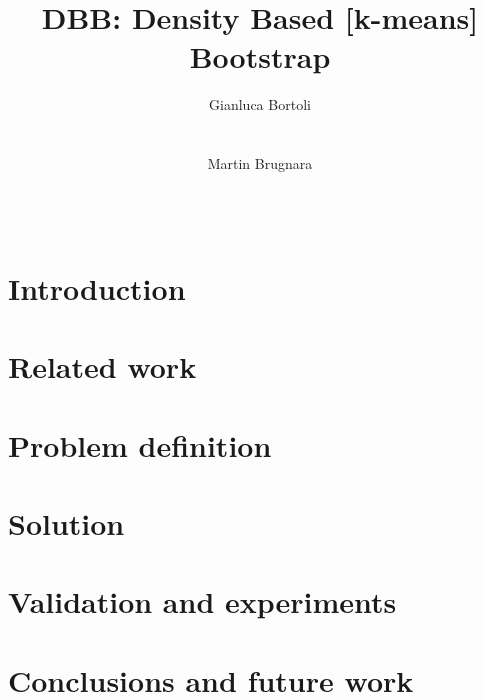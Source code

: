 \documentclass{sig-alternate-15}
\begin{document}
\title{DBB: Density Based [k-means] Bootstrap}

\author{
    \alignauthor{}
    Gianluca Bortoli\\
           \\
           \\
    \alignauthor{}
    Martin Brugnara\\
           \\
           \\
    }
\maketitle


\begin{abstract}

\end{abstract}


\printccsdesc{}


\section{Introduction}

\section{Related work}

\section{Problem definition}

\section{Solution}

\section{Validation and experiments}

\section{Conclusions and future work}



%



%
%
\end{document}
